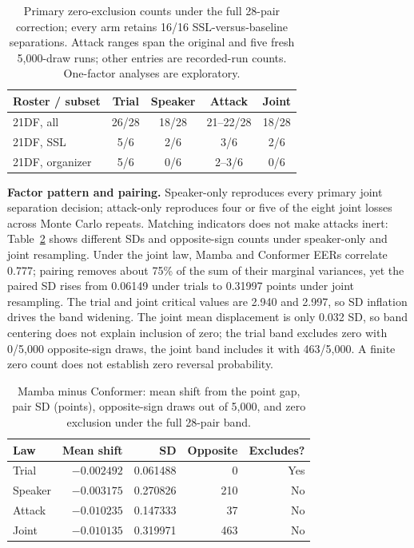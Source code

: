 \documentclass{article}
\renewcommand{\small}{\fontsize{9.1pt}{10.5pt}\selectfont}
\begin{document}
\begin{table}[t]
\caption{Primary zero-exclusion counts under the full 28-pair correction; every arm retains 16/16 SSL-versus-baseline separations. Attack ranges span the original and five fresh 5,000-draw runs; other entries are recorded-run counts. One-factor analyses are exploratory.}
\label{tab:arms}
\centering\small
\setlength{\tabcolsep}{3pt}
\begin{tabular}{@{}lcccc@{}}
\toprule
Roster / subset & Trial & Speaker & Attack & Joint \\
\midrule
21DF, all & 26/28 & 18/28 & 21--22/28 & 18/28 \\
21DF, SSL & 5/6 & 2/6 & 3/6 & 2/6 \\
21DF, organizer & 5/6 & 0/6 & 2--3/6 & 0/6 \\
\bottomrule
\end{tabular}
\end{table}

\textbf{Factor pattern and pairing.} Speaker-only reproduces every primary joint separation decision; attack-only reproduces four or five of the eight joint losses across Monte Carlo repeats. Matching indicators does not make attacks inert: Table~\ref{tab:sign} shows different SDs and opposite-sign counts under speaker-only and joint resampling. Under the joint law, Mamba and Conformer EERs correlate 0.777; pairing removes about 75\% of the sum of their marginal variances, yet the paired SD rises from 0.06149 under trials to 0.31997 points under joint resampling. The trial and joint critical values are 2.940 and 2.997, so SD inflation drives the band widening. The joint mean displacement is only 0.032 SD, so band centering does not explain inclusion of zero; the trial band excludes zero with 0/5,000 opposite-sign draws, the joint band includes it with 463/5,000. A finite zero count does not establish zero reversal probability.

\begin{table}[t]
\caption{Mamba minus Conformer: mean shift from the point gap, pair SD (points), opposite-sign draws out of 5,000, and zero exclusion under the full 28-pair band.}
\label{tab:sign}
\centering\small
\setlength{\tabcolsep}{4pt}
\begin{tabular}{@{}lrrrr@{}}
\toprule
Law & Mean shift & SD & Opposite & Excludes? \\
\midrule
Trial & $-0.002492$ & 0.061488 & 0 & Yes \\
Speaker & $-0.003175$ & 0.270826 & 210 & No \\
Attack & $-0.010235$ & 0.147333 & 37 & No \\
Joint & $-0.010135$ & 0.319971 & 463 & No \\
\bottomrule
\end{tabular}
\end{table}
\end{document}
